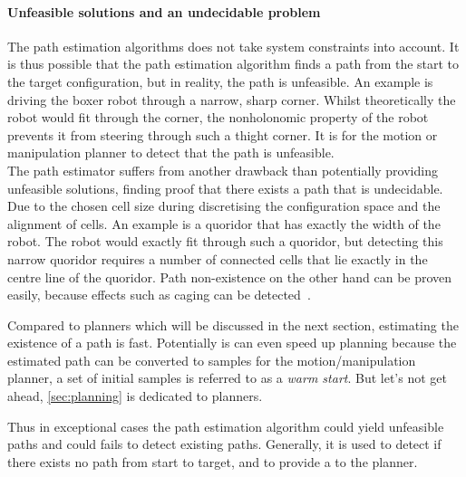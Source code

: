 \paragraph{Unfeasible solutions and an undecidable problem}
The path estimation algorithms does not take system constraints into account. It is thus possible that the path estimation algorithm finds a path from the start to the target configuration, but in reality, the path is unfeasible. An example is driving the boxer robot through a narrow, sharp corner. Whilst theoretically the robot would fit through the corner, the nonholonomic property of the robot prevents it from steering through such a thight corner. It is for the motion or manipulation planner to detect that the path is unfeasible.\\The path estimator suffers from another drawback than potentially providing unfeasible solutions, finding proof that there exists a path that is undecidable. Due to the chosen cell size during discretising the configuration space and the alignment of cells. An example is a quoridor that has exactly the width of the robot. The robot would exactly fit through such a quoridor, but detecting this narrow quoridor requires a number of connected cells that lie exactly in the centre line of the quoridor. Path non-existence on the other hand can be proven easily, because effects such as caging can be detected~\cite{chen_fast_2018}.\bs

Compared to planners which will be discussed in the next section, estimating the existence of a path is fast. Potentially is can even speed up planning because the estimated path can be converted to samples for the motion/manipulation planner, a set of initial samples is referred to as a \textit{warm start}. But let's not get ahead, \cref{sec:planning} is dedicated to planners.\bs

Thus in exceptional cases the path estimation algorithm could yield unfeasible paths and could fails to detect existing paths. Generally, it is used to detect if there exists no path from start to target, and to provide a  to the planner. \bs

